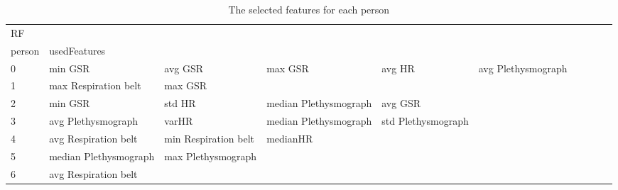 \begin{landscape}
\begin{table}[]
\centering
\caption{The selected features for each person}
\begin{tabular}{l|llllllll}
RF       &                         &                         &                         &                         &                         &                       &                         &                         &                         &         \\
person   & usedFeatures            &                         &                         &                         &                         &                       &                         &                         &                         &         \\
0        & min GSR                 & avg GSR                 & max GSR                 & avg HR                  & avg Plethysmograph      &                       &                         &                         &                         &         \\
1        & max Respiration belt    & max GSR                 &                         &                         &                         &                       &                         &                         &                         &         \\
2        & min GSR                 & std HR                  & median Plethysmograph   & avg GSR                 &                         &                       &                         &                         &                         &         \\
3        & avg Plethysmograph      & varHR                   & median Plethysmograph   & std Plethysmograph      &                         &                       &                         &                         &                         &         \\
4        & avg Respiration belt    & min Respiration belt    & medianHR                &                         &                         &                       &                         &                         &                         &         \\
5        & median Plethysmograph   & max Plethysmograph      &                         &                         &                         &                       &                         &                         &                         &         \\
6        & avg Respiration belt    &                         &                         &                         &                         &                       &                         &                         &                         &         \\

\end{tabular}
\end{table}
\end{landscape}
